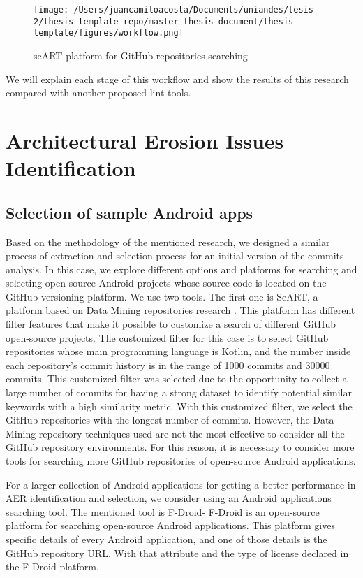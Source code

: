 \begin{figure}[h]
    	\centering
    		\texttt{[image: /Users/juancamiloacosta/Documents/uniandes/tesis 2/thesis template repo/master-thesis-document/thesis-template/figures/workflow.png]}
   			 \caption{seART platform for GitHub repositories searching \cite{} }
   			 \label{fig:ast}
\end{figure}


We will explain each stage of this workflow and show the results of this research compared with another proposed lint tools.

\section{Architectural Erosion Issues Identification}

\subsection{Selection of sample Android apps}
Based on the methodology of the mentioned research, we designed a similar process of extraction and selection process for an initial version of the commits analysis. In this case, we explore different options and platforms for searching and selecting open-source Android projects whose source code is located on the GitHub versioning platform. We use two tools. The first one is SeART, a platform based on Data Mining repositories research \cite{seart_platform}. This platform has different filter features that make it possible to customize a search of different GitHub open-source projects. The customized filter for this case is to select GitHub repositories whose main programming language is Kotlin, and the number inside each repository's commit history is in the range of 1000 commits and 30000 commits. This customized filter was selected due to the opportunity to collect a large number of commits for having a strong dataset to identify potential similar keywords with a high similarity metric. With this customized filter, we select the GitHub repositories with the longest number of commits. However, the Data Mining repository techniques used are not the most effective to consider all the GitHub repository environments. For this reason, it is necessary to consider more tools for searching more GitHub repositories of open-source Android applications.



For a larger collection of Android applications for getting a better performance in AER identification and selection, we consider using an Android applications searching tool. The mentioned tool is F-Droid- F-Droid is an open-source platform for searching open-source Android applications. This platform gives specific details of every Android application, and one of those details is the GitHub repository URL. With that attribute and the type of license declared in the F-Droid platform.

